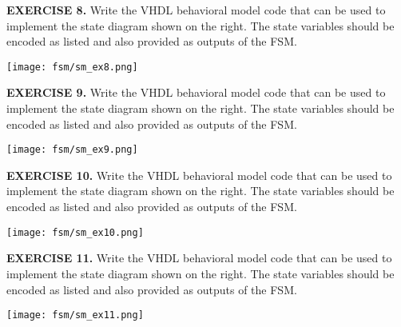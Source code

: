 \vspace{20pt}
\noindent
\begin{minipage}[t]{0.5\textwidth}
\textbf{EXERCISE 8.}
Write the VHDL behavioral model code that can be used to implement the state diagram shown on the right. The state variables should be encoded as listed and also provided as outputs of the FSM.
\end{minipage}
\begin{minipage}[t]{0.47\textwidth}
\vspace{0pt}\raggedright
\centering
\texttt{[image: fsm/sm\_ex8.png]}
\end{minipage}

\vspace{20pt}
\noindent
\begin{minipage}[t]{0.5\textwidth}
\textbf{EXERCISE 9.}
Write the VHDL behavioral model code that can be used to implement the state diagram shown on the right. The state variables should be encoded as listed and also provided as outputs of the FSM.
\end{minipage}
\begin{minipage}[t]{0.47\textwidth}
\vspace{0pt}\raggedright
\centering
\texttt{[image: fsm/sm\_ex9.png]}
\end{minipage}

\vspace{20pt}
\noindent
\begin{minipage}[t]{0.5\textwidth}
\textbf{EXERCISE 10.}
Write the VHDL behavioral model code that can be used to implement the state diagram shown on the right. The state variables should be encoded as listed and also provided as outputs of the FSM.
\end{minipage}
\begin{minipage}[t]{0.47\textwidth}
\vspace{0pt}\raggedright
\centering
\texttt{[image: fsm/sm\_ex10.png]}
\end{minipage}

\vspace{20pt}
\noindent
\begin{minipage}[t]{0.5\textwidth}
\textbf{EXERCISE 11.}
Write the VHDL behavioral model code that can be used to implement the state diagram shown on the right. The state variables should be encoded as listed and also provided as outputs of the FSM.
\end{minipage}
\begin{minipage}[t]{0.47\textwidth}
\vspace{0pt}\raggedright
\centering
\texttt{[image: fsm/sm\_ex11.png]}
\end{minipage}

